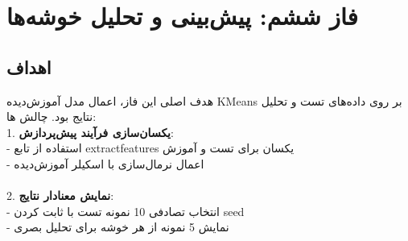 \documentclass[a4paper,12pt]{article}
\let\nobreaksection\section
\renewcommand{\section}{\nobreaksection}
\begin{document}
	
	
	\section{فاز ششم: پیش‌بینی و تحلیل خوشه‌ها}
	
	\subsection*{\textbf{اهداف }}
	هدف اصلی این فاز، اعمال مدل آموزش‌دیده KMeans بر روی داده‌های تست و تحلیل نتایج بود. چالش ها:
	\\
	1. \textbf{یکسان‌سازی فرآیند پیش‌پردازش}:
	\\
	- استفاده از تابع extractfeatures یکسان برای تست و آموزش
	\\
	- اعمال نرمال‌سازی با اسکیلر آموزش‌دیده
	\\
	\\
	2. \textbf{نمایش معنادار نتایج}:
	\\
	- انتخاب تصادفی 10 نمونه تست با ثابت کردن seed
	\\
	- نمایش 5 نمونه از هر خوشه برای تحلیل بصری
	
	
\end{document}
